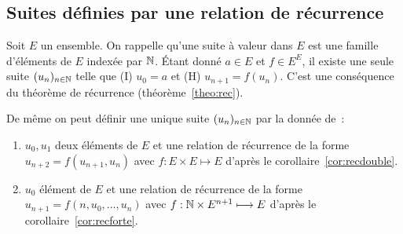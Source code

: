 \subsection{Suites définies par une relation de récurrence}

Soit $E$ un ensemble. On rappelle qu'une suite à valeur dans $E$ est une famille d'éléments de $E$ indexée par $\mathbb{N}$. Étant donné $a\in E$ et $f\in E^E$, il existe une seule suite $(u_n)_{n\in\mathbb{N}}$ telle que (I) $u_0=a$ et (H) $u_{n+1}=f(u_n)$. C'est une conséquence du théorème de récurrence (théorème~\ref{theo:rec}).

De même on peut définir une unique suite $(u_n)_{n\in\mathbb{N}}$ par la donnée de~:
\begin{enumerate}
\item $u_0, u_1$ deux éléments de $E$ et une relation de récurrence de la forme $u_{n+2}=f(u_{n+1},u_{n})$ avec $f:E\times E\longmapsto E$ d'après le corollaire~\ref{cor:recdouble}.
\item $u_0$ élément de $E$ et une relation de récurrence de la forme $u_{n+1}=f(n,u_{0},\ldots,u_{n})$ avec $f:\mathbb{N}\times E^{n+1}\longmapsto E$ d'après le corollaire~\ref{cor:recforte}.
\end{enumerate}

